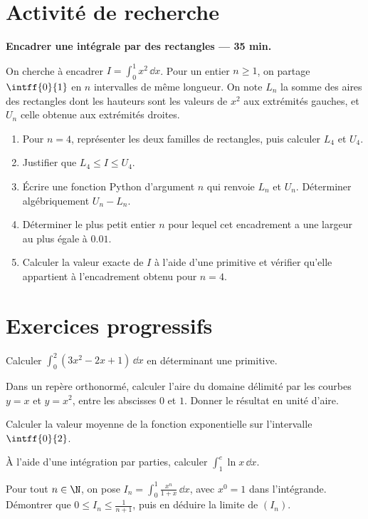 \mxnewpage
\section{Activité de recherche}\textbf{Encadrer une intégrale par des rectangles --- 35 min.}\par On cherche à encadrer $I=\displaystyle\int_0^1x^2\,\dd x$. Pour un entier $n\ge1$, on partage $\intff{0}{1}$ en $n$ intervalles de même longueur. On note $L_n$ la somme des aires des rectangles dont les hauteurs sont les valeurs de $x^2$ aux extrémités gauches, et $U_n$ celle obtenue aux extrémités droites.
\begin{enumerate}\item Pour $n=4$, représenter les deux familles de rectangles, puis calculer $L_4$ et $U_4$.
\item Justifier que $L_4\le I\le U_4$.
\item Écrire une fonction Python d'argument $n$ qui renvoie $L_n$ et $U_n$. Déterminer algébriquement $U_n-L_n$.
\item Déterminer le plus petit entier $n$ pour lequel cet encadrement a une largeur au plus égale à $\num{0,01}$.
\item Calculer la valeur exacte de $I$ à l'aide d'une primitive et vérifier qu'elle appartient à l'encadrement obtenu pour $n=4$.\end{enumerate}

\mxnewpage
\section{Exercices progressifs}

Calculer $\displaystyle\int_0^2(3x^2-2x+1)\,\dd x$ en déterminant une primitive.

Dans un repère orthonormé, calculer l'aire du domaine délimité par les courbes $y=x$ et $y=x^2$, entre les abscisses $0$ et $1$. Donner le résultat en unité d'aire.

Calculer la valeur moyenne de la fonction exponentielle sur l'intervalle $\intff{0}{2}$.

À l'aide d'une intégration par parties, calculer $\displaystyle\int_1^e\ln x\,\dd x$.

Pour tout $n\in\N$, on pose $I_n=\displaystyle\int_0^1\frac{x^n}{1+x}\,\dd x$, avec $x^0=1$ dans l'intégrande. Démontrer que $0\le I_n\le\frac1{n+1}$, puis en déduire la limite de $(I_n)$.

